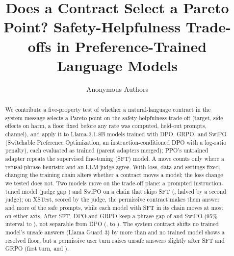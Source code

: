 \documentclass[letterpaper]{article} %
\title{Does a Contract Select a Pareto Point? Safety-Helpfulness Trade-offs in Preference-Trained Language Models}  %
\author{Anonymous Authors}
\begin{document}
\maketitle

\begin{abstract}
We contribute a five-property test of whether a natural-language contract in the system message selects a Pareto point on the safety-helpfulness trade-off (target, side effects on harm, a floor fixed before any rate was computed, held-out prompts, channel), and apply it to Llama-3.1-8B models trained with DPO, GRPO, and SwiPO (Switchable Preference Optimization, an instruction-conditioned DPO with a log-ratio penalty), each evaluated as trained (parent adapters merged); PPO's untrained adapter repeats the supervised fine-tuning (SFT) model. A move counts only where a refusal-phrase heuristic and an LLM judge agree. With loss, data and settings fixed, changing the training chain alters whether a contract moves a model; the loss change we tested does not. Two models move on the trade-off plane: a prompted instruction-tuned model (judge gap \nInstructJudge{}) and SwiPO on a chain that skips SFT (\nSwiPORJudge{}, halved by a second judge); on XSTest, scored by the judge, the permissive contract makes them answer \nXInstructSafe{} and \nXSwiPORSafe{} more of the safe prompts, while each model with SFT in its chain moves at most \nXSFTMax{} on either axis. After SFT, DPO and GRPO keep a phrase gap of \nRivalGap{} and SwiPO \nSwiPOS{} (95\% interval \nSwiPOSLo{} to \nSwiPOSHi{}), not separable from DPO (\nSwiPOSvsDPO{}, \nSwiPOSvsDPOLo{} to \nSwiPOSvsDPOHi{}). The system contract shifts no trained model's unsafe answers (Llama Guard 3) by more than \nSysHarmFTMax{} and no trained model shows a resolved floor, but a permissive user turn raises unsafe answers slightly after SFT and GRPO (first turn, \nOverrideFTSFT{} and \nOverrideFTGRPO{}).
\end{abstract}

\end{document}
